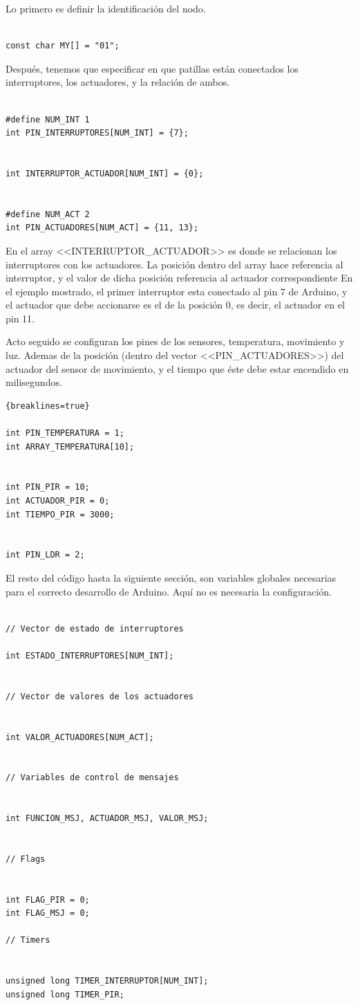 Lo primero es definir la identificación del nodo.
\begin{lstlisting}

const char MY[] = "01";

\end{lstlisting}

Después, tenemos que especificar en que patillas están conectados los interruptores, los actuadores, y la relación de ambos.

\begin{lstlisting}

#define NUM_INT 1
int PIN_INTERRUPTORES[NUM_INT] = {7};


int INTERRUPTOR_ACTUADOR[NUM_INT] = {0};


#define NUM_ACT 2
int PIN_ACTUADORES[NUM_ACT] = {11, 13};

\end{lstlisting}

En el array <<INTERRUPTOR\_ACTUADOR>> es donde se relacionan los interruptores con los actuadores. La posición dentro del array hace referencia al interruptor, y el valor de dicha posición referencia al actuador correspondiente En el ejemplo mostrado, el primer interruptor esta conectado al pin 7 de Arduino, y el actuador que debe accionarse es el de la posición 0, es decir, el actuador en el pin 11.

Acto seguido se configuran los pines de los sensores, temperatura, movimiento y luz. Ademas de la posición (dentro del vector <<PIN\_ACTUADORES>>) del actuador del sensor de movimiento, y el tiempo que éste debe estar encendido en milisegundos. 

\begin{lstlisting}{breaklines=true}

int PIN_TEMPERATURA = 1;
int ARRAY_TEMPERATURA[10];


int PIN_PIR = 10;
int ACTUADOR_PIR = 0;
int TIEMPO_PIR = 3000;


int PIN_LDR = 2;
\end{lstlisting}

El resto del código hasta la siguiente sección, son variables globales necesarias para el correcto desarrollo de Arduino. Aquí no es necesaria la configuración.

\begin{lstlisting}

// Vector de estado de interruptores

int ESTADO_INTERRUPTORES[NUM_INT];


// Vector de valores de los actuadores


int VALOR_ACTUADORES[NUM_ACT];


// Variables de control de mensajes


int FUNCION_MSJ, ACTUADOR_MSJ, VALOR_MSJ;


// Flags


int FLAG_PIR = 0;
int FLAG_MSJ = 0;

// Timers


unsigned long TIMER_INTERRUPTOR[NUM_INT];
unsigned long TIMER_PIR;

\end{lstlisting}

